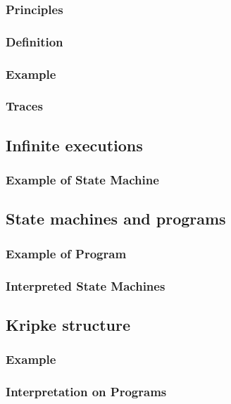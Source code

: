\documentclass[12pt, a4paper]{book}
\begin{document}
  \subsubsection{Principles}
  \label{subs:Principles}
  \subsubsection{Definition}
  \label{subs:Definition}
  \subsubsection{Example}
  \label{subs:Example}
  \subsubsection{Traces}
  \label{subs:Traces}
  \subsection{Infinite executions}
  \label{sub:Infinite executions}
  \subsubsection{Example of State Machine}
  \label{subs:Example of State Machine}
  \subsection{State machines and programs}
  \label{sub:State machines and programs}
  \subsubsection{Example of Program}
  \label{subs:Example of Program}
  \subsubsection{Interpreted State Machines}
  \label{subs:Interpreted State Machines}
  \subsection{Kripke structure}
  \label{sub:Kripke structure}
  \subsubsection{Example}
  \label{subs:Example}
  \subsubsection{Interpretation on Programs}
  \label{subs:Interpretation on Programs}
\end{document}
